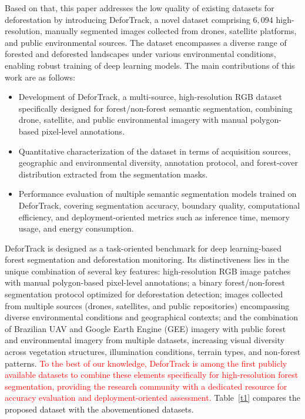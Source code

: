 \documentclass[journal,article,submit,pdftex,moreauthors]{Definitions/mdpi}
\begin{document}
Based on that, this paper addresses the low quality of existing datasets for deforestation by introducing DeforTrack, a novel dataset comprising $6,094$ high-resolution, manually segmented images collected from drones, satellite platforms, and public environmental sources. The dataset encompasses a diverse range of forested and deforested landscapes under various environmental conditions, enabling robust training of deep learning models. The main contributions of this work are as follows:

\begin{itemize}
    \item Development of DeforTrack, a multi-source, high-resolution RGB dataset specifically designed for forest/non-forest semantic segmentation, combining drone, satellite, and public environmental imagery with manual polygon-based pixel-level annotations.
    
    \item Quantitative characterization of the dataset in terms of acquisition sources, geographic and environmental diversity, annotation protocol, and forest-cover distribution extracted from the segmentation masks.
    
    \item Performance evaluation of multiple semantic segmentation models trained on DeforTrack, covering segmentation accuracy, boundary quality, computational efficiency, and deployment-oriented metrics such as inference time, memory usage, and energy consumption.
\end{itemize}

DeforTrack is designed as a task-oriented benchmark for deep learning-based forest segmentation and deforestation monitoring. Its distinctiveness lies in the unique combination of several key features: high-resolution RGB image patches with manual polygon-based pixel-level annotations; a binary forest/non-forest segmentation protocol optimized for deforestation detection; images collected from multiple sources (drones, satellites, and public repositories) encompassing diverse environmental conditions and geographical contexts; and the combination of Brazilian UAV and Google Earth Engine (GEE) imagery with public forest and environmental imagery from multiple datasets, increasing visual diversity across vegetation structures, illumination conditions, terrain types, and non-forest
patterns. \textcolor{red}{To the best of our knowledge, DeforTrack is among the first publicly available datasets to combine these elements specifically for high-resolution forest segmentation, providing the research community with a dedicated resource for accuracy evaluation and deployment-oriented assessment.} Table~\ref{t1} compares the proposed dataset with the abovementioned datasets.
\end{document}

